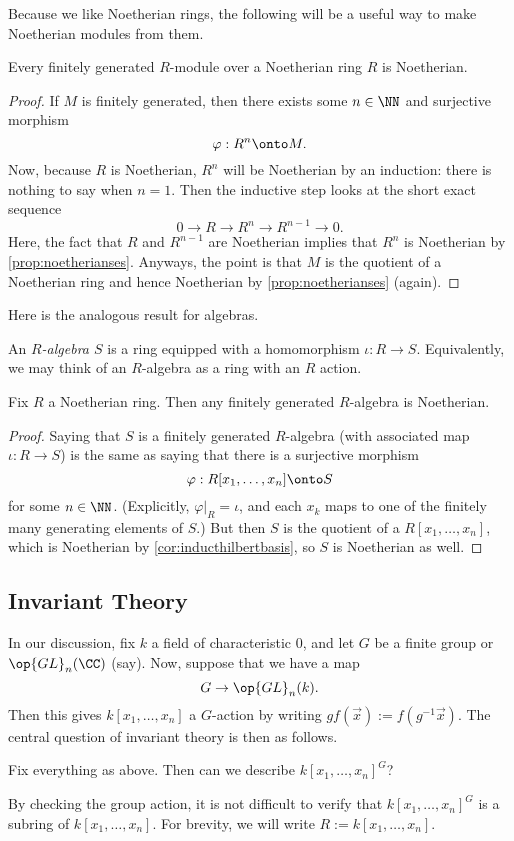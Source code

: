 Because we like Noetherian rings, the following will be a useful way to make Noetherian modules from them.
\begin{proposition}
	Every finitely generated $R$-module over a Noetherian ring $R$ is Noetherian.
\end{proposition}
\begin{proof}
	If $M$ is finitely generated, then there exists some $n\in\NN$ and surjective morphism
	\[\varphi:R^n\onto M.\]
	Now, because $R$ is Noetherian, $R^n$ will be Noetherian by an induction: there is nothing to say when $n=1$. Then the inductive step looks at the short exact sequence
	\[0\to R\to R^n\to R^{n-1}\to 0.\]
	Here, the fact that $R$ and $R^{n-1}$ are Noetherian implies that $R^n$ is Noetherian by \autoref{prop:noetherianses}. Anyways, the point is that $M$ is the quotient of a Noetherian ring and hence Noetherian by \autoref{prop:noetherianses} (again).
\end{proof}
Here is the analogous result for algebras.
\begin{definition}[Algebra]
	An \textit{$R$-algebra $S$} is a ring equipped with a homomorphism $\iota:R\to S$. Equivalently, we may think of an $R$-algebra as a ring with an $R$ action.
\end{definition}
\begin{prop}
	Fix $R$ a Noetherian ring. Then any finitely generated $R$-algebra is Noetherian.
\end{prop}
\begin{proof}
	Saying that $S$ is a finitely generated $R$-algebra (with associated map $\iota:R\to S$) is the same as saying that there is a surjective morphism
	\[\varphi:R[x_1,\ldots,x_n]\onto S\]
	for some $n\in\NN$. (Explicitly, $\varphi|_R=\iota$, and each $x_k$ maps to one of the finitely many generating elements of $S$.) But then $S$ is the quotient of a $R[x_1,\ldots,x_n]$, which is Noetherian by \autoref{cor:inducthilbertbasis}, so $S$ is Noetherian as well.
\end{proof}

\subsection{Invariant Theory}
In our discussion, fix $k$ a field of characteristic $0$, and let $G$ be a finite group or $\op{GL}_n(\CC)$ (say). Now, suppose that we have a map
\[G\to\op{GL}_n(k).\]
Then this gives $k[x_1,\ldots,x_n]$ a $G$-action by writing $gf(\vec x):=f(g^{-1}\vec x).$ The central question of invariant theory is then as follows.
\begin{ques}
	Fix everything as above. Then can we describe $k[x_1,\ldots,x_n]^G$?
\end{ques}
By checking the group action, it is not difficult to verify that $k[x_1,\ldots,x_n]^G$ is a subring of $k[x_1,\ldots,x_n]$. For brevity, we will write $R:=k[x_1,\ldots,x_n]$.

